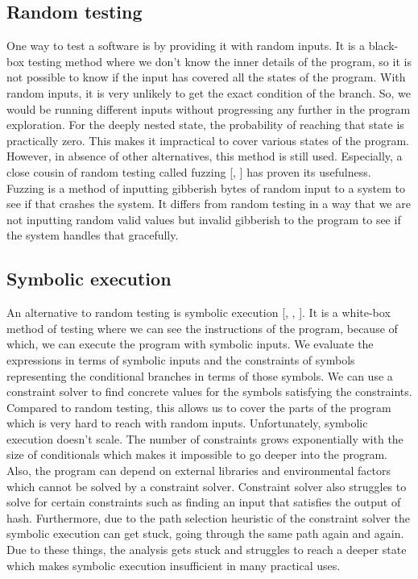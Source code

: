\documentclass[ runningheads,
               a4paper]{llncs}
\begin{document}
\subsection{Random testing}
One way to test a software is by providing it with random inputs. It is a black-box testing method where we don't know the inner details of the program, so it is not possible to know if the input has covered all the states of the program. With random inputs, it is very unlikely to get the exact condition of the branch. So, we would be running different inputs without progressing any further in the program exploration. For the deeply nested state, the probability of reaching that state is practically zero. This makes it impractical to cover various states of the program. However, in absence of other alternatives, this method is still used. Especially, a close cousin of random testing called fuzzing [\cite{godefroid2020fuzzing}, \cite{miller1990empirical}] has proven its usefulness. Fuzzing is a method of inputting gibberish bytes of random input to a system to see if that crashes the system. It differs from random testing in a way that we are not inputting random valid values but invalid gibberish to the program to see if the system handles that gracefully.


\subsection{Symbolic execution}
An alternative to random testing is symbolic execution [\cite{king1976symbolic}, \cite{baldoni2018survey}, \cite{cadar2011symbolic}]. It is a white-box method of testing where we can see the instructions of the program, because of which, we can execute the program with symbolic inputs. We evaluate the expressions in terms of symbolic inputs and the constraints of symbols representing the conditional branches in terms of those symbols. We can use a constraint solver to find concrete values for the symbols satisfying the constraints. Compared to random testing, this allows us to cover the parts of the program which is very hard to reach with random inputs. Unfortunately, symbolic execution doesn't scale. The number of constraints grows exponentially with the size of conditionals which makes it impossible to go deeper into the program. Also, the program can depend on external libraries and environmental factors which cannot be solved by a constraint solver. Constraint solver also struggles to solve for certain constraints such as finding an input that satisfies the output of hash. Furthermore, due to the path selection heuristic of the constraint solver the symbolic execution can get stuck, going through the same path again and again. Due to these things, the analysis gets stuck and struggles to reach a deeper state which makes symbolic execution insufficient in many practical uses.
\end{document}
